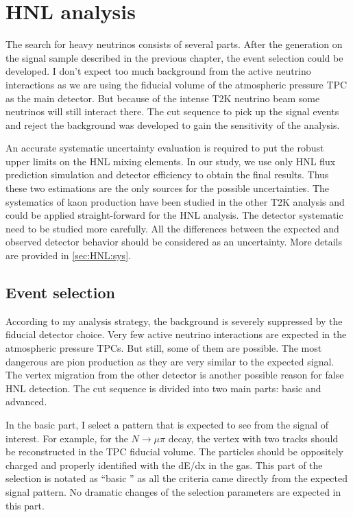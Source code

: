 \documentclass[../main.tex]{subfiles}
\begin{document}
\chapter{HNL analysis}
\label{ch:HNL:ana}

The search for heavy neutrinos consists of several parts. After the generation on the signal sample described in the previous chapter, the event selection could be developed. I don't expect too much background from the active neutrino interactions as we are using the fiducial volume of the atmospheric pressure TPC as the main detector. But because of the intense T2K neutrino beam some neutrinos will still interact there. The cut sequence to pick up the signal events and reject the background was developed to gain the sensitivity of the analysis.

An accurate systematic uncertainty evaluation is required to put the robust upper limits on the HNL mixing elements. In our study, we use only HNL flux prediction simulation and detector efficiency to obtain the final results. Thus these two estimations are the only sources for the possible uncertainties. The systematics of kaon production have been studied in the other T2K analysis and could be applied straight-forward for the HNL analysis. The detector systematic need to be studied more carefully. All the differences between the expected and observed detector behavior should be considered as an uncertainty. More details are provided in \autoref{sec:HNL:sys}.

\section{Event selection}
\label{sec:HNL:sel}
According to my analysis strategy, the background is severely suppressed by the fiducial detector choice. Very few active neutrino interactions are expected in the atmospheric pressure TPCs. But still, some of them are possible. The most dangerous are pion production as they are very similar to the expected signal. The vertex migration from the other detector is another possible reason for false HNL detection. The cut sequence is divided into two main parts: basic and advanced.

In the basic part, I select a pattern that is expected to see from the signal of interest. For example, for the $N\to\mu\pi$ decay, the vertex with two tracks should be reconstructed in the TPC fiducial volume. The particles should be oppositely charged and properly identified with the dE/dx in the gas. This part of the selection is notated as ``basic '' as all the criteria came directly from the expected signal pattern. No dramatic changes of the selection parameters are expected in this part.
\end{document}
